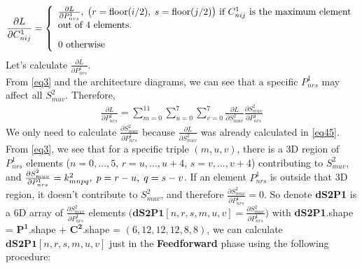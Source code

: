 \documentclass[a4paper,12pt]{article}
\begin{document}
\begin{equation}
\begin{aligned}
\frac{\partial{L}}{\partial{C^1_{nij}}} = \left\{
                                            \begin{array}{ll}
                                              \frac{\partial{L}}{\partial{P^1_{nrs}}},\thickspace \big(r = \text{floor}(i/2), \thickspace s = \text{floor}(j/2)\big) \text{ if } C^1_{nij} \text{ is the maximum element}\\ \text{out of 4 elements. } \\[0.3cm]
                                              0 \text{ otherwise }
                                            \end{array}
                                          \right. \label{eq53}
\end{aligned}
\end{equation}
Let's calculate $\frac{\partial{L}}{\partial{P^1_{nrs}}}$.\\
From \eqref{eq3} and the architecture diagrams, we can see that a specific $P^1_{nrs}$ may affect all $S^2_{muv}$. Therefore,
\begin{equation}
\begin{aligned}
\frac{\partial{L}}{\partial{P^1_{nrs}}} = \sum\limits_{m = 0}^{11}\sum\limits_{u = 0}^{7}\sum\limits_{v = 0}^{7}\frac{\partial{L}}{\partial{S^2_{muv}}}\frac{\partial{S^2_{muv}}}{\partial{P^1_{nrs}}} \label{eq54}
\end{aligned}
\end{equation}
We only need to calculate $\frac{\partial{S^2_{muv}}}{\partial{P^1_{nrs}}}$ because $\frac{\partial{L}}{\partial{S^2_{muv}}}$ was already calculated in \eqref{eq45}.\\
From \eqref{eq3}, we see that for a specific triple $(m, u, v)$, there is a 3D region of $P^1_{nrs}$ elements ($n = 0,...,5$, $r = u,...,u + 4$, $s = v,...,v + 4$) contributing to $S^2_{muv}$, and $\frac{\partial{S^2_{muv}}}{\partial{P^1_{nrs}}} = k^2_{mnpq}, \thickspace p = r - u, \thickspace q = s - v$. If an element $P^1_{nrs}$ is outside that 3D region, it doesn't contribute to $S^2_{muv}$, and therefore $\frac{\partial{S^2_{muv}}}{\partial{P^1_{nrs}}} = 0$. So denote \textbf{dS2P1} is a 6D array of $\frac{\partial{S^2_{muv}}}{\partial{P^1_{nrs}}}$ elements $\Big(\textbf{dS2P1}[n, r, s, m, u, v] = \frac{\partial{S^2_{muv}}}{\partial{P^1_{nrs}}}\Big)$ with \textbf{dS2P1}.shape = $\boldsymbol{P^1}$.shape + $\boldsymbol{C^2}$.shape = $(6, 12, 12, 12, 8, 8)$, we can calculate $\textbf{dS2P1}[n, r, s, m, u, v]$ just in the \textbf{Feedforward} phase using the following procedure:\\
\end{document}

